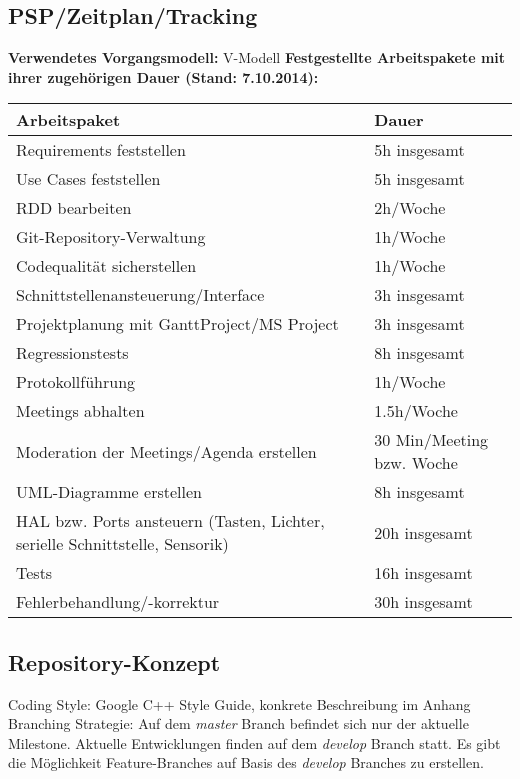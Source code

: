 \documentclass[oneside,a4paper,titlepage]{scrartcl} %
\begin{document}
\subsection{PSP/Zeitplan/Tracking}
\textbf{Verwendetes Vorgangsmodell:} V-Modell\newline
\newline
\textbf{Festgestellte Arbeitspakete mit ihrer zugehörigen Dauer (Stand: 7.10.2014):}\newline
\newline
 \begin{small}
  \begin{tabular}{|p{8cm}|p{5cm}|}
   \hline
   \rowcolor{gray}\textbf{Arbeitspaket} & \textbf{Dauer}\\
   \hline
   Requirements feststellen & 5h insgesamt\\
   \hline
   Use Cases feststellen & 5h insgesamt\\
   \hline
   RDD bearbeiten & 2h/Woche\\
   \hline
   Git-Repository-Verwaltung & 1h/Woche\\
   \hline
   Codequalität sicherstellen & 1h/Woche\\
   \hline
   Schnittstellenansteuerung/Interface & 3h insgesamt\\
   \hline
   Projektplanung mit GanttProject/MS Project & 3h insgesamt\\
   \hline
   Regressionstests & 8h insgesamt\\
   \hline
   Protokollführung & 1h/Woche\\
   \hline
   Meetings abhalten & 1.5h/Woche\\
   \hline
   Moderation der Meetings/Agenda erstellen & 30 Min/Meeting bzw. Woche\\
   \hline
   UML-Diagramme erstellen & 8h insgesamt\\
   \hline
   HAL bzw. Ports ansteuern (Tasten, Lichter, serielle Schnittstelle, Sensorik) & 20h insgesamt\\
   \hline
   Tests & 16h insgesamt\\
   \hline
   Fehlerbehandlung/-korrektur & 30h insgesamt\\
   \hline
  \end{tabular}
\end{small}

\subsection{Repository-Konzept}
Coding Style: Google C++ Style Guide, konkrete Beschreibung im Anhang\newline
Branching Strategie: Auf dem \emph{master} Branch befindet sich nur der aktuelle Milestone.\newline
Aktuelle Entwicklungen finden auf dem \emph{develop} Branch statt.\newline
Es gibt die Möglichkeit Feature-Branches auf Basis des \emph{develop} Branches zu erstellen.
\end{document}
